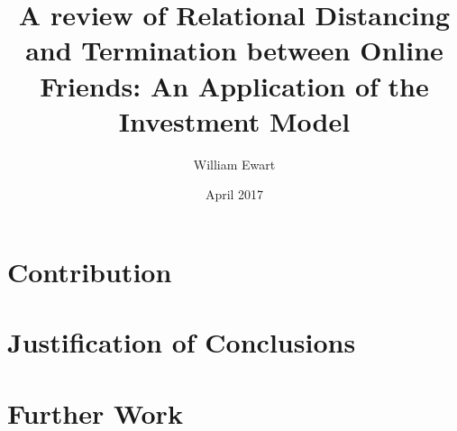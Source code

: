 \documentclass[12pt]{article}
\title{A review of Relational Distancing and Termination between Online Friends: An Application of the Investment Model}
\author{William Ewart}
\date{April 2017}
\begin{document}
\begin{titlingpage}
\maketitle
\tableofcontents
\end{titlingpage}
\newpage

\section{Contribution}
\section{Justification of Conclusions}
\section{Further Work}



\end{document}
